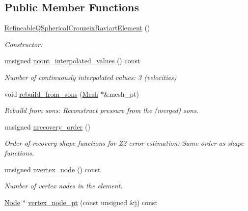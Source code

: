 \subsection*{Public Member Functions}
\begin{DoxyCompactItemize}
\item 
\hyperlink{classoomph_1_1RefineableQSphericalCrouzeixRaviartElement_a410be200f53a4a5e5d18c9e09a58d78d}{Refineable\+Q\+Spherical\+Crouzeix\+Raviart\+Element} ()
\begin{DoxyCompactList}\small\item\em Constructor\+: \end{DoxyCompactList}\item 
unsigned \hyperlink{classoomph_1_1RefineableQSphericalCrouzeixRaviartElement_ab2d2448ca25da6b58a565a8ca18c5e06}{ncont\+\_\+interpolated\+\_\+values} () const
\begin{DoxyCompactList}\small\item\em Number of continuously interpolated values\+: 3 (velocities) \end{DoxyCompactList}\item 
void \hyperlink{classoomph_1_1RefineableQSphericalCrouzeixRaviartElement_a956defebeb39dd292746c03b935e92b3}{rebuild\+\_\+from\+\_\+sons} (\hyperlink{classoomph_1_1Mesh}{Mesh} $\ast$\&mesh\+\_\+pt)
\begin{DoxyCompactList}\small\item\em Rebuild from sons\+: Reconstruct pressure from the (merged) sons. \end{DoxyCompactList}\item 
unsigned \hyperlink{classoomph_1_1RefineableQSphericalCrouzeixRaviartElement_a1e1489874c8a952f2556c14fdea41010}{nrecovery\+\_\+order} ()
\begin{DoxyCompactList}\small\item\em Order of recovery shape functions for Z2 error estimation\+: Same order as shape functions. \end{DoxyCompactList}\item 
unsigned \hyperlink{classoomph_1_1RefineableQSphericalCrouzeixRaviartElement_a9784f4a6c9cc49169b0089b85373c434}{nvertex\+\_\+node} () const
\begin{DoxyCompactList}\small\item\em Number of vertex nodes in the element. \end{DoxyCompactList}\item 
\hyperlink{classoomph_1_1Node}{Node} $\ast$ \hyperlink{classoomph_1_1RefineableQSphericalCrouzeixRaviartElement_ac75e04db8f4da1e84990a2b22c8b19fb}{vertex\+\_\+node\+\_\+pt} (const unsigned \&j) const

\end{DoxyCompactItemize}
